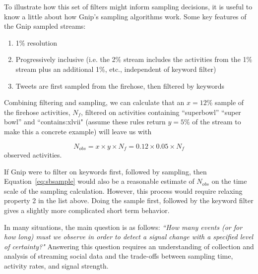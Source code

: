 \documentclass{article}
\begin{document}
To illustrate how this set of filters might inform sampling decisions, it is useful to know a little about how Gnip's sampling algorithms work.  Some key features of the Gnip sampled streams:

\begin{enumerate}
	\item 1\% resolution 
	\item Progressively inclusive (i.e. the 2\% stream includes the activities from the 1\% stream plus an additional 1\%, etc., independent of keyword filter)
	\item Tweets are first sampled from the firehose, then filtered by keywords 
\end{enumerate}


Combining filtering and sampling, we can calculate that an $x=12$\% sample of the firehose activities, $N_f$, filtered on activities containing ``superbowl'' ``super bowl'' and ``contains:xlvii" (assume these rules return $y=5$\% of the stream to make this a concrete example) will leave us with


\begin{equation}
    \label{eq:sbsample}
    N_{obs} = x \times y \times N_f = 0.12\times0.05\times N_f
\end{equation}
observed activities. 

If Gnip were to filter on keywords first, followed by sampling, then Equation~\ref{eq:sbsample} would also be a reasonable estimate of $N_{obs}$ on the time scale of the sampling calculation. However, this process would require relaxing property 2 in the list above. 
Doing the sample first, followed by the keyword filter gives a slightly more complicated short term behavior.


In many situations, the main question is as follows: \emph{``How many events (or for how long) must we observe in order to detect a signal change with a specified level of certainty?"} Answering this question requires an understanding of collection and analysis of streaming social data and the trade-offs between sampling time, activity rates, and signal strength. 
\end{document}
